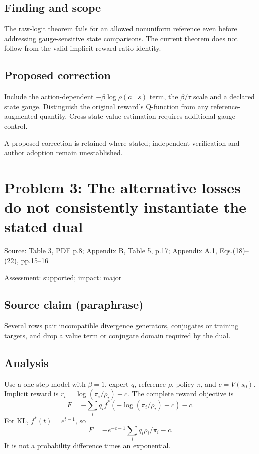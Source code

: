 \documentclass[11pt]{article}
\begin{document}
\subsection*{Finding and scope}

The raw-logit theorem fails for an allowed nonuniform reference even before addressing gauge-sensitive state comparisons. The current theorem does not follow from the valid implicit-reward ratio identity.

\subsection*{Proposed correction}

Include the action-dependent \(-\beta\log\rho(a\mid s)\) term, the \(\beta/\tau\) scale and a declared state gauge. Distinguish the original reward’s Q-function from any reference-augmented quantity. Cross-state value estimation requires additional gauge control.

A proposed correction is retained where stated; independent verification and author adoption remain unestablished.

\section*{Problem 3: The alternative losses do not consistently instantiate the stated dual}

Source: Table 3, PDF p.8; Appendix B, Table 5, p.17; Appendix A.1, Eqs.(18)–(22), pp.15–16

Assessment: supported; impact: major

\subsection*{Source claim (paraphrase)}

Several rows pair incompatible divergence generators, conjugates or training targets, and drop a value term or conjugate domain required by the dual.

\subsection*{Analysis}

Use a one-step model with \(\beta=1\), expert \(q\), reference \(\rho\), policy \(\pi\), and \(c=V(s_0)\). Implicit reward is \(r_i=\log(\pi_i/\rho_i)+c\). The complete reward objective is \[F=-\sum_i q_i f^*(-\log(\pi_i/\rho_i)-c)-c.\] For KL, \(f^*(t)=e^{t-1}\), so \[F=-e^{-c-1}\sum_i q_i\rho_i/\pi_i-c.\] It is not a probability difference times an exponential.
\end{document}
